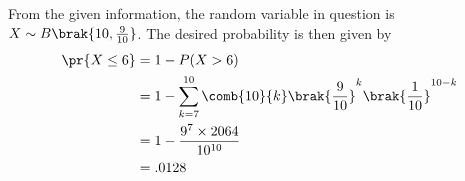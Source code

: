 From the given information, the random variable in question is $X \sim B\brak{10,\frac{9}{10}}$.
The desired probability is then given by 
\begin{align}
\pr{X\le 6} & = 1-P(X>6) \\ 
              &  =1-\sum_{k=7}^{10}\comb{10}{k}\brak{\frac{9}{10}}^k\brak{\frac{1}{10}}^{10-k} \\
             &=1-\frac{9^7\times 2064}{10^{10}}\\ 
             &=.0128
\end{align}            
